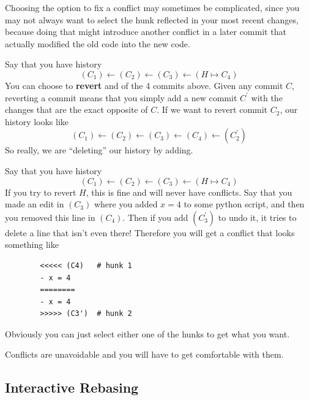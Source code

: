\documentclass{article}
\begin{document}
    Choosing the option to fix a conflict may sometimes be complicated, since you may not always want to select the hunk reflected in your most recent changes, because doing that might introduce another conflict in a later commit that actually modified the old code into the new code. 

    \begin{definition} 
      Say that you have history
      \begin{equation}
        (C_1) \leftarrow (C_2) \leftarrow (C_3) \leftarrow (H \mapsto C_4)
      \end{equation} 
      You can choose to \textbf{revert} and of the 4 commits above. Given any commit $C$, reverting a commit means that you simply add a new commit $C^\prime$ with the changes that are the exact opposite of $C$. If we want to revert commit $C_2$, our history looks like 
      \begin{equation}
        (C_1) \leftarrow (C_2) \leftarrow (C_3) \leftarrow (C_4) \leftarrow (C_2^\prime)
      \end{equation}  
      So really, we are ``deleting'' our history by adding. 
    \end{definition} 

    \begin{example}
      Say that you have history
      \begin{equation}
        (C_1) \leftarrow (C_2) \leftarrow (C_3) \leftarrow (H \mapsto C_4)
      \end{equation} 
      If you try to revert $H$, this is fine and will never have conflicts. Say that you made an edit in $(C_3)$ where you added $x = 4$ to some python script, and then you removed this line in $(C_4)$. Then if you add $(C_3^\prime)$ to undo it, it tries to delete a line that isn't even there! Therefore you will get a conflict that looks something like 
      \begin{lstlisting}
        <<<<< (C4)   # hunk 1 
        - x = 4 
        ========
        - x = 4
        >>>>> (C3')  # hunk 2
      \end{lstlisting}
      Obviously you can just select either one of the hunks to get what you want. 
    \end{example} 

    Conflicts are unavoidable and you will have to get comfortable with them.  

  \subsection{Interactive Rebasing} 
\end{document}
